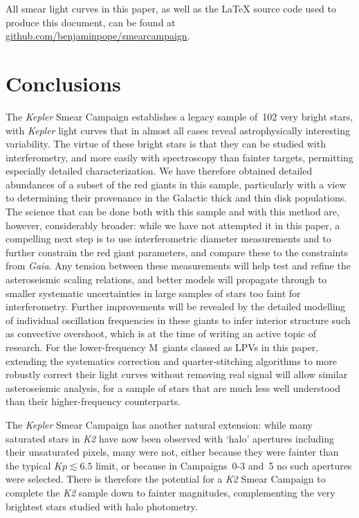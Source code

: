 \documentclass[a4paper,fleqn,usenatbib]{mnras}
\newcommand{\kepler}{\emph{Kepler}\xspace}
\newcommand{\ktwo}{\emph{K2}\xspace}
\newcommand{\gaia}{\emph{Gaia}\xspace}
\begin{document}
All smear light curves in this paper, as well as the \LaTeX{} source code used to produce this document, can be found
at \url{github.com/benjaminpope/smearcampaign}.


\section{Conclusions}
\label{conclusions}

The \kepler Smear Campaign establishes a legacy sample of~102 very bright stars, with \kepler light curves that in almost all cases reveal astrophysically interesting variability. The virtue of these bright stars is that they can be studied with interferometry, and more easily with spectroscopy than fainter targets, permitting especially detailed characterization. We have therefore obtained detailed abundances of a subset of the red giants in this sample, particularly with a view to determining their provenance in the Galactic thick and thin disk populations. The science that can be done both with this sample and with this method are, however, considerably broader: while we have not attempted it in this paper, a compelling next step is to use interferometric diameter measurements and to further constrain the red giant parameters, and compare these to the constraints from \gaia. Any tension between these measurements will help test and refine the asteroseismic scaling relations, and better models will propagate through to smaller systematic uncertainties in large samples of stars too faint for interferometry. Further improvements will be revealed by the detailed modelling of individual oscillation frequencies in these giants to infer interior structure such as convective overshoot, which is at the time of writing an active topic of research. For the lower-frequency M~giants classed as LPVs in this paper, extending the systematics correction and quarter-stitching algorithms to more robustly correct their light curves without removing real signal will allow similar asteroseismic analysis, for a sample of stars that are much less well understood than their higher-frequency counterparts. 

The \kepler Smear Campaign has another natural extension: while many saturated stars in \ktwo have now been observed with `halo' apertures including their unsaturated pixels, many were not, either because they were fainter than the typical $Kp \lesssim 6.5$ limit, or because in Campaigns~0-3 and~5 no such apertures were selected. There is therefore the potential for a \ktwo Smear Campaign to complete the \ktwo sample down to fainter magnitudes, complementing the very brightest stars studied with halo photometry. 
\end{document}

